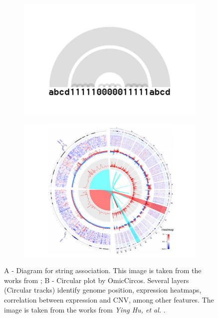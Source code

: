 \begin{figure}[b]
    \centering
    \begin{subfigure}{0.5\linewidth}
    \centering
        \includegraphics[width=0.9\linewidth]{Figures/arcplots.pdf}
        \caption{}
        \label{fig:genomic}
    \end{subfigure}%
    \begin{subfigure}{0.5\linewidth}
        \centering
        \includegraphics[width=0.9\linewidth]{Figures/genomics.pdf}
        \caption{}
        \label{fig:genomic}
    \end{subfigure}
    \caption{A - Diagram for string association. This image is taken from the works from \cite{arcplots}; B - Circular plot by OmicCircos. Several layers (Circular tracks) identify genome position, expression heatmaps, correlation between expression and CNV, among other features. The image is taken from the works from \textit{Ying Hu, et al.} \cite{genomics}.}
\end{figure}

